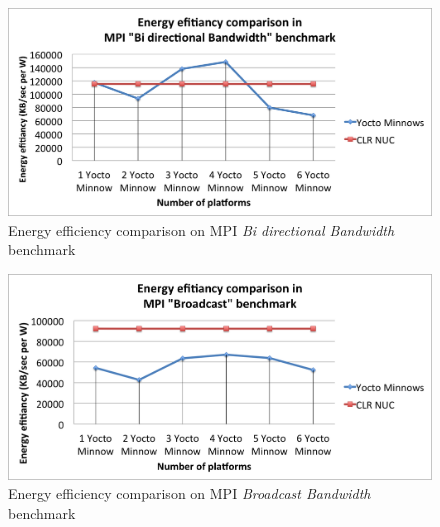 \begin{figure}[H]
\centering
\includegraphics[width=1 \textwidth]{images/energy_results/bibw.png}
\caption{Energy efficiency comparison on MPI \textit{Bi directional Bandwidth} benchmark}
\label{bibw_energy}
\end{figure}


\begin{figure}[H]
\centering
\includegraphics[width=1 \textwidth]{images/energy_results/broadcast.png}
\caption{Energy efficiency comparison on MPI \textit{Broadcast Bandwidth} benchmark}
\label{broadcast_energy}
\end{figure}


\clearpage
